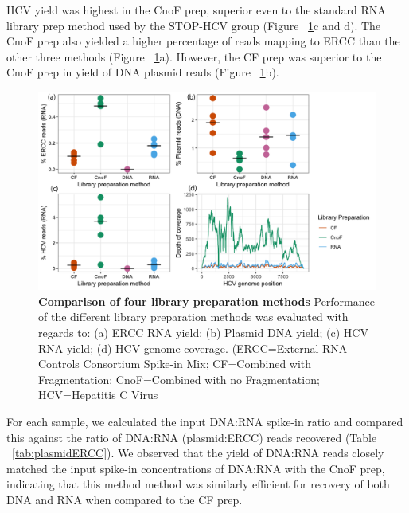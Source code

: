 HCV yield was highest in the CnoF prep, superior even to the standard RNA library prep method used by the STOP-HCV group (Figure ~\ref{fig:Fig4libprep}c and d). The CnoF prep also yielded a higher percentage of reads mapping to ERCC than the other three methods (Figure ~\ref{fig:Fig4libprep}a). However, the CF prep was superior to the CnoF prep in yield of DNA plasmid reads (Figure ~\ref{fig:Fig4libprep}b).

\FloatBarrier
\newpage
\begin{figure}
\centering
\includegraphics[width=\textwidth, scale=0.9]{./Results1/Images/libprep.png}
\caption[Comparison of four library preparation methods]{\textbf{Comparison of four library preparation methods} Performance of the different library preparation methods was evaluated with regards to: (a) ERCC RNA yield; (b) Plasmid DNA yield; (c) HCV RNA yield; (d) HCV genome coverage. (ERCC=External RNA Controls Consortium Spike-in Mix; CF=Combined with Fragmentation; CnoF=Combined with no Fragmentation; HCV=Hepatitis C Virus}
\label{fig:Fig4libprep}


\end{figure}
\FloatBarrier



For each sample, we calculated the input DNA:RNA spike-in ratio and compared this against the ratio of DNA:RNA (plasmid:ERCC) reads recovered (Table ~\ref{tab:plasmidERCC}). We observed that the yield of DNA:RNA reads closely matched the input spike-in concentrations of DNA:RNA with the CnoF prep, indicating that this method method was similarly efficient for recovery of both DNA and RNA when compared to the CF prep.

